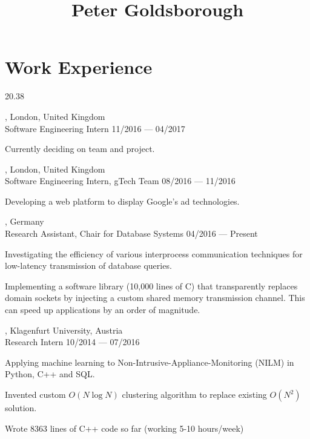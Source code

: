 




\begin{header}
	\title{Peter Goldsborough}
	\separate
	\separate
\end{header}

\section{Work Experience}{2}{0.38}

\begin{entry}
	{, London, United Kingdom}
	{\\Software Engineering Intern}
	{11/2016 --- 04/2017}
	\item Currently deciding on team and project.
\end{entry}

\begin{entry}
	{, London, United Kingdom}
	{\\Software Engineering Intern, gTech Team}
	{08/2016 --- 11/2016}
	\item Developing a web platform to display Google's ad technologies.
\end{entry}

\begin{entry}
	{, Germany}
	{\\Research Assistant, Chair for Database Systems}
	{04/2016 --- Present}

  \item Investigating the efficiency of various interprocess communication techniques for low-latency transmission of database queries.
  \item Implementing a software library (10,000 lines of C) that transparently replaces domain sockets by injecting a custom shared memory transmission channel. This can speed up applications by an order of magnitude.
\end{entry}

\begin{entry}
	{, Klagenfurt University, Austria}
	{\\Research Intern}
	{10/2014 --- 07/2016}

\item Applying machine learning to Non-Intrusive-Appliance-Monitoring (NILM) in Python, C++ and SQL.
	\item Invented custom $O(N \log N)$ clustering algorithm to replace existing $O(N^2)$ solution.
	\item Wrote 8363 lines of C++ code so far (working 5-10 hours/week)
\end{entry}

